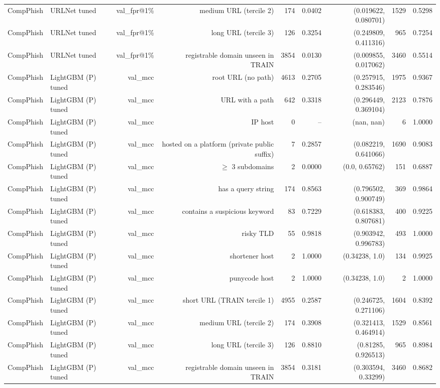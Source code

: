 \begin{table}[t]
\begin{tabular}{llrrrrrrr}
CompPhish & URLNet tuned & val\_fpr@1\% & medium URL (tercile 2) & 174 & 0.0402 & (0.019622, 0.080701) & 1529 & 0.5298 \\
CompPhish & URLNet tuned & val\_fpr@1\% & long URL (tercile 3) & 126 & 0.3254 & (0.249809, 0.411316) & 965 & 0.7254 \\
CompPhish & URLNet tuned & val\_fpr@1\% & registrable domain unseen in TRAIN & 3854 & 0.0130 & (0.009855, 0.017062) & 3460 & 0.5514 \\
CompPhish & LightGBM (P) tuned & val\_mcc & root URL (no path) & 4613 & 0.2705 & (0.257915, 0.283546) & 1975 & 0.9367 \\
CompPhish & LightGBM (P) tuned & val\_mcc & URL with a path & 642 & 0.3318 & (0.296449, 0.369104) & 2123 & 0.7876 \\
CompPhish & LightGBM (P) tuned & val\_mcc & IP host & 0 & -- & (nan, nan) & 6 & 1.0000 \\
CompPhish & LightGBM (P) tuned & val\_mcc & hosted on a platform (private public suffix) & 7 & 0.2857 & (0.082219, 0.641066) & 1690 & 0.9083 \\
CompPhish & LightGBM (P) tuned & val\_mcc & $\geq$ 3 subdomains & 2 & 0.0000 & (0.0, 0.65762) & 151 & 0.6887 \\
CompPhish & LightGBM (P) tuned & val\_mcc & has a query string & 174 & 0.8563 & (0.796502, 0.900749) & 369 & 0.9864 \\
CompPhish & LightGBM (P) tuned & val\_mcc & contains a suspicious keyword & 83 & 0.7229 & (0.618383, 0.807681) & 400 & 0.9225 \\
CompPhish & LightGBM (P) tuned & val\_mcc & risky TLD & 55 & 0.9818 & (0.903942, 0.996783) & 493 & 1.0000 \\
CompPhish & LightGBM (P) tuned & val\_mcc & shortener host & 2 & 1.0000 & (0.34238, 1.0) & 134 & 0.9925 \\
CompPhish & LightGBM (P) tuned & val\_mcc & punycode host & 2 & 1.0000 & (0.34238, 1.0) & 2 & 1.0000 \\
CompPhish & LightGBM (P) tuned & val\_mcc & short URL (TRAIN tercile 1) & 4955 & 0.2587 & (0.246725, 0.271106) & 1604 & 0.8392 \\
CompPhish & LightGBM (P) tuned & val\_mcc & medium URL (tercile 2) & 174 & 0.3908 & (0.321413, 0.464914) & 1529 & 0.8561 \\
CompPhish & LightGBM (P) tuned & val\_mcc & long URL (tercile 3) & 126 & 0.8810 & (0.81285, 0.926513) & 965 & 0.8984 \\
CompPhish & LightGBM (P) tuned & val\_mcc & registrable domain unseen in TRAIN & 3854 & 0.3181 & (0.303594, 0.33299) & 3460 & 0.8682 \\

\end{tabular}
\end{table}
